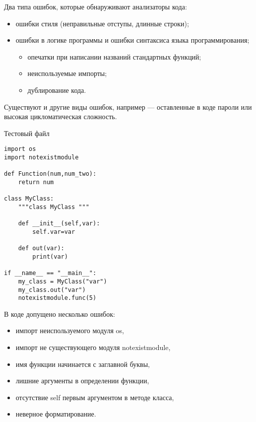 \documentclass[xcolor=table]{beamer}
\begin{document}
\begin{frame}[fragile]
	Два типа ошибок, которые обнаруживают анализаторы кода:
	\begin{itemize}
		\item ошибки стиля (неправильные отступы, длинные строки); 	
		\item ошибки в логике программы и ошибки синтаксиса языка программирования;
		\begin{itemize}
			\item опечатки при написании названий стандартных функций;
			\item неиспользуемые импорты;
			\item дублирование кода.
		\end{itemize} 
	\end{itemize}

	Существуют и другие виды ошибок, например — оставленные в коде пароли или высокая цикломатическая сложность.	
\end{frame}

\begin{frame}{Тестовый файл}
	\begin{verbatim}
import os
import notexistmodule

def Function(num,num_two):
    return num
	
class MyClass:
    """class MyClass """

    def __init__(self,var):
        self.var=var

    def out(var):
        print(var)

if __name__ == "__main__":
    my_class = MyClass("var")
    my_class.out("var")
    notexistmodule.func(5)
	\end{verbatim}
\end{frame}

\begin{frame}[fragile]
	В коде допущено несколько ошибок:
	\begin{itemize}
		\item импорт неиспользуемого модуля os,
		\item импорт не существующего модуля notexistmodule,
		\item имя функции начинается с заглавной буквы,
		\item лишние аргументы в определении функции,
		\item отсутствие self первым аргументом в методе класса,
		\item неверное форматирование.
	\end{itemize}	
\end{frame}
\end{document}
